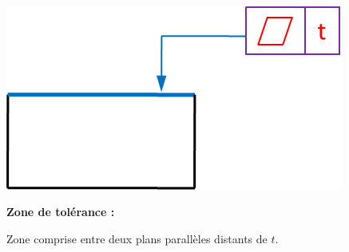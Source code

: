 \documentclass[11pt,oneside]{article}
\begin{document}
\begin{exemple}
\begin{minipage}[t]{.3\linewidth}
\begin{center}
$\;$ 

\includegraphics[width=.95\textwidth]{png/zt_plan}
\end{center}
\end{minipage} \hfill
\begin{minipage}[t]{.3\linewidth}
\textbf{Zone de tolérance :}

Zone comprise entre deux plans parallèles distants de $t$.
\end{minipage} \hfill
\begin{minipage}[t]{.3\linewidth}
\begin{center}
\end{center}
\end{minipage} 
\end{exemple}
\end{document}
